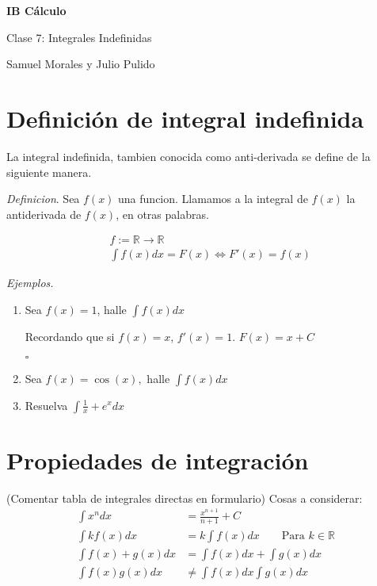 \documentclass[spanish,12pt]{article}
\newcommand{\R}{\mathbb{R}}
\begin{document}
	\begin{titlepage}
	\begin{center}
	\hspace{0pt}
	\vfill
	{\Large\textbf{{IB Cálculo}}}
	
	\medskip
	Clase 7: Integrales Indefinidas
	
	\medskip
    Samuel Morales y Julio Pulido
	
	\thispagestyle{empty}
	\vfill
	\end{center}
	\end{titlepage}
\newpage
\tableofcontents
\newpage
\section{Definición de integral indefinida}

La integral indefinida, tambien conocida como anti-derivada se define de la siguiente manera.

\textit{Definicion}. Sea $f(x)$ una funcion. Llamamos a la integral de $f(x)$ la antiderivada de $f(x)$, en otras palabras.

\begin{align*}
    &f:=\R \rightarrow \R\\
    &\int f(x) dx = F(x) \iff F'(x)=f(x)
\end{align*}

\textit{Ejemplos.}
\begin{enumerate}[(1)]
    \item Sea $f(x)=1$, halle $\int f(x) dx$
    
        Recordando que si $f(x)=x$, $f'(x)=1$. $F(x)=x+C$
        
\hfill $\square$

\item Sea $f(x)=\cos(x),$ halle $\int f(x)dx$
\item Resuelva $\int \frac{1}{x}+e^x dx$
\end{enumerate}

\section{Propiedades de integración}

(Comentar tabla de integrales directas en formulario)
Cosas a considerar:
\begin{align*}
    \int x^ndx &= \frac{x^{n+1}}{n+1}+C\\
    \int kf(x)dx &= k\int f(x)dx \qquad \text{Para } k\in\R\\
    \int f(x) + g(x)dx &= \int f(x)dx + \int g(x)dx\\
    \int f(x)g(x)dx &\neq \int f(x)dx\int g(x)dx
\end{align*}
\end{document}
